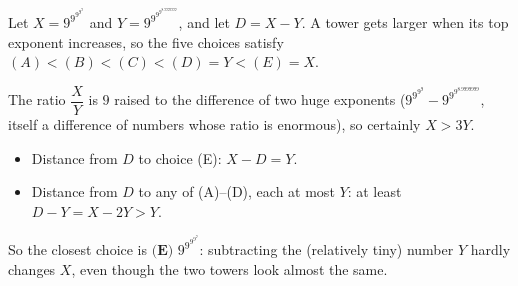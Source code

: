 Let $X=9^{9^{9^{9^{9}}}}$ and $Y=9^{9^{9^{9^{8.9999999}}}}$, and let $D=X-Y$. A tower gets larger when its top exponent increases, so the five choices satisfy $(A)<(B)<(C)<(D)=Y<(E)=X$.

The ratio $\dfrac XY$ is $9$ raised to the difference of two huge exponents ($9^{9^{9^9}}-9^{9^{9^{8.9999999}}}$, itself a difference of numbers whose ratio is enormous), so certainly $X>3Y$.
\begin{itemize}
\item Distance from $D$ to choice (E): $X-D=Y$.
\item Distance from $D$ to any of (A)--(D), each at most $Y$: at least $D-Y=X-2Y>Y$.
\end{itemize}
So the closest choice is $\boxed{\textbf{(E) }9^{9^{9^{9^{9}}}}}$: subtracting the (relatively tiny) number $Y$ hardly changes $X$, even though the two towers look almost the same.
